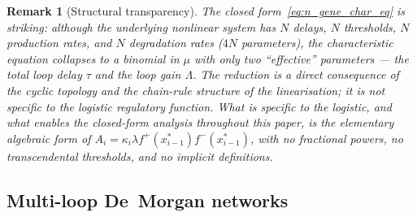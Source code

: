 \documentclass[sn-mathphys,Numbered]{sn-jnl}
\theoremstyle{thmstyleone}
\theoremstyle{thmstyletwo}
\theoremstyle{thmstylethree}
\newtheorem{remark}{Remark}
\begin{document}
\begin{remark}[Structural transparency]
The closed form~\eqref{eq:n_gene_char_eq} is striking: although the
underlying nonlinear system has $N$ delays, $N$ thresholds, $N$
production rates, and $N$ degradation rates ($4N$ parameters), the
characteristic equation collapses to a binomial in $\mu$ with only two
``effective'' parameters --- the total loop delay $\tau$ and the loop
gain $\Lambda$. The reduction is a direct consequence of the cyclic
topology and the chain-rule structure of the linearisation; it is
\emph{not} specific to the logistic regulatory function. What
\emph{is} specific to the logistic, and what enables the closed-form
analysis throughout this paper, is the elementary algebraic form of
$A_i = \kappa_i\lambda f^+(x_{i-1}^*)f^-(x_{i-1}^*)$, with no fractional
powers, no transcendental thresholds, and no implicit definitions.
\end{remark}

\subsection{Multi-loop De~Morgan networks}
\end{document}
